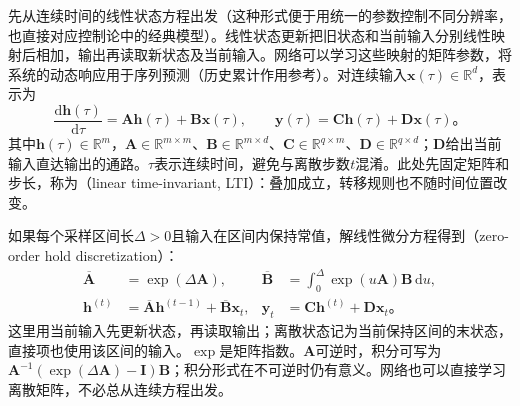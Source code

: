 先从连续时间的线性状态方程出发（这种形式便于用统一的参数控制不同分辨率，也直接对应控制论中的经典模型）。线性状态更新把旧状态和当前输入分别线性映射后相加，输出再读取新状态及当前输入。网络可以学习这些映射的矩阵参数，将系统的动态响应用于序列预测（历史累计作用参考）。对连续输入$\bm{x}(\tau)\in\mathbb{R}^{d}$，表示为
\begin{equation}
  \frac{\mathrm{d}\bm{h}(\tau)}{\mathrm{d}\tau}
    =\bm{A}\bm{h}(\tau)+\bm{B}\bm{x}(\tau),
  \qquad
  \bm{y}(\tau)=\bm{C}\bm{h}(\tau)+\bm{D}\bm{x}(\tau)\text{。}
  \label{eq:rnn-continuous-ssm}
\end{equation}
其中$\bm{h}(\tau)\in\mathbb{R}^{m}$，$\bm{A}\in\mathbb{R}^{m\times m}$、$\bm{B}\in\mathbb{R}^{m\times d}$、$\bm{C}\in\mathbb{R}^{q\times m}$、$\bm{D}\in\mathbb{R}^{q\times d}$；$\bm{D}$给出当前输入直达输出的通路。$\tau$表示连续时间，避免与离散步数$t$混淆。此处先固定矩阵和步长，称为（linear time-invariant, LTI）：叠加成立，转移规则也不随时间位置改变。

如果每个采样区间长$\Delta>0$且输入在区间内保持常值，解线性微分方程得到（zero-order hold discretization）：
\begin{equation}
  \begin{aligned}
    \overline{\bm{A}}&=\exp(\Delta\bm{A}),
    &\overline{\bm{B}}&=\int_0^{\Delta}\exp(u\bm{A})\bm{B}\,\mathrm{d}u,\\
    \bm{h}^{(t)}&=\overline{\bm{A}}\bm{h}^{(t-1)}
       +\overline{\bm{B}}\bm{x}_t,
    &\bm{y}_t&=\bm{C}\bm{h}^{(t)}+\bm{D}\bm{x}_t\text{。}
  \end{aligned}
  \label{eq:rnn-ssm-zoh}
\end{equation}
这里用当前输入先更新状态，再读取输出；离散状态记为当前保持区间的末状态，直接项也使用该区间的输入。$\exp$是矩阵指数。$\bm{A}$可逆时，积分可写为$\bm{A}^{-1}(\exp(\Delta\bm{A})-\bm{I})\bm{B}$；积分形式在不可逆时仍有意义。网络也可以直接学习离散矩阵，不必总从连续方程出发。

